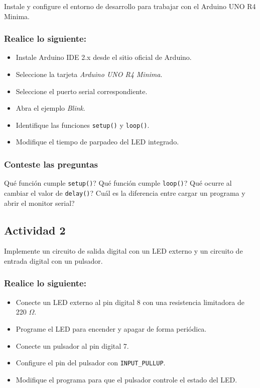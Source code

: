 Instale y configure el entorno de desarrollo para trabajar con el Arduino UNO R4 Minima.

\subsubsection{Realice lo siguiente:}
\begin{itemize}
    \item Instale Arduino IDE 2.x desde el sitio oficial de Arduino.
    \item Seleccione la tarjeta \textit{Arduino UNO R4 Minima}.
    \item Seleccione el puerto serial correspondiente.
    \item Abra el ejemplo \textit{Blink}.
    \item Identifique las funciones \texttt{setup()} y \texttt{loop()}.
    \item Modifique el tiempo de parpadeo del LED integrado.
\end{itemize}

\subsubsection{Conteste las preguntas}

\textquestiondown Qué función cumple \texttt{setup()}? \textquestiondown Qué función cumple \texttt{loop()}? \textquestiondown Qué ocurre al cambiar el valor de \texttt{delay()}? \textquestiondown Cuál es la diferencia entre cargar un programa y abrir el monitor serial?

\subsection{Actividad 2}

Implemente un circuito de salida digital con un LED externo y un circuito de entrada digital con un pulsador.

\subsubsection{Realice lo siguiente:}
\begin{itemize}
    \item Conecte un LED externo al pin digital 8 con una resistencia limitadora de 220 $\Omega$.
    \item Programe el LED para encender y apagar de forma periódica.
    \item Conecte un pulsador al pin digital 7.
    \item Configure el pin del pulsador con \texttt{INPUT\_PULLUP}.
    \item Modifique el programa para que el pulsador controle el estado del LED.
\end{itemize}

